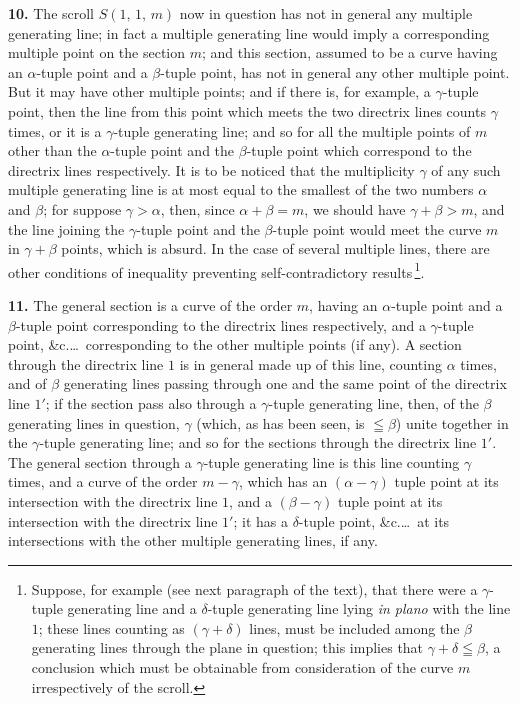 \documentclass[11pt,a4paper]{article}
\begin{document}
\textbf{10.} The scroll $S(1,\,1,\,m)$ now in question has not in general any multiple generating line; in fact a multiple generating line would imply a corresponding multiple point on the section $m$; and this section, assumed to be a curve having an $\alpha$-tuple point and a $\beta$-tuple point, has not in general any other multiple point. But it may have other multiple points; and if there is, for example, a $\gamma$-tuple point, then the line from this point which meets the two directrix lines counts $\gamma$ times, or it is a $\gamma$-tuple generating line; and so for all the multiple points of $m$ other than the $\alpha$-tuple point and the $\beta$-tuple point which correspond to the directrix lines respectively. It is to be noticed that the multiplicity $\gamma$ of any such multiple generating line is at most equal to the smallest of the two numbers $\alpha$ and $\beta$; for suppose $\gamma > \alpha$, then, since $\alpha + \beta = m$, we should have $\gamma + \beta > m$, and the line joining the $\gamma$-tuple point and the $\beta$-tuple point would meet the curve $m$ in $\gamma + \beta$ points, which is absurd. In the case of several multiple lines, there are other conditions of inequality preventing self-contradictory results\,\footnote{Suppose, for example (see next paragraph of the text), that there were a $\gamma$-tuple generating line and a $\delta$-tuple generating line lying \textit{in plano} with the line $1$; these lines counting as $(\gamma + \delta)$ lines, must be included among the $\beta$ generating lines through the plane in question; this implies that $\gamma + \delta \leqq \beta$, a conclusion which must be obtainable from consideration of the curve $m$ irrespectively of the scroll.}.

\medskip

\textbf{11.} The general section is a curve of the order $m$, having an $\alpha$-tuple point and a $\beta$-tuple point corresponding to the directrix lines respectively, and a $\gamma$-tuple point, \&c.\ldots\ corresponding to the other multiple points (if any). A section through the directrix line $1$ is in general made up of this line, counting $\alpha$ times, and of $\beta$ generating lines passing through one and the same point of the directrix line $1'$; if the section pass also through a $\gamma$-tuple generating line, then, of the $\beta$ generating lines in question, $\gamma$ (which, as has been seen, is $\leqq \beta$) unite together in the $\gamma$-tuple generating line; and so for the sections through the directrix line $1'$. The general section through a $\gamma$-tuple generating line is this line counting $\gamma$ times, and a curve of the order $m - \gamma$, which has an $(\alpha - \gamma)$ tuple point at its intersection with the directrix line $1$, and a $(\beta - \gamma)$ tuple point at its intersection with the directrix line $1'$; it has a $\delta$-tuple point, \&c.\ldots\ at its intersections with the other multiple generating lines, if any.
\end{document}
